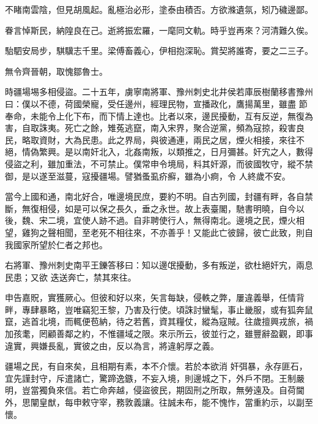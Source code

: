 \begin{pinyinscope}
 不睹南雲陰，但見胡風起。亂極治必形，塗泰由積否。方欲滌遺氛，矧乃穢邊鄙。



 眷言悼斯民，納隍良在己。逝將振宏羅，一麾同文軌。時乎豈再來？河清難久俟。



 駘駟安局步，騏驥志千里。梁傅畜義心，伊相抱深恥。賞契將誰寄，要之二三子。



 無令齊晉朝，取愧鄒魯士。



 時疆場埸多相侵盜。二十五年，虜寧南將軍、豫州刺史北井侯若庫辰樹蘭移書豫州曰：僕以不德，荷國榮寵，受任邊州，經理民物，宣播政化，鷹揚萬里，雖盡
 節奉命，未能令上化下布，而下情上達也。比者以來，邊民擾動，互有反逆，無復為害，自取誅夷。死亡之餘，雉菟逃竄，南入宋界，聚合逆黨，頻為寇掠，殺害良民，略取資財，大為民患。此之界局，與彼通連，兩民之居，煙火相接，來往不絕，情偽繁興。是以南奸北入，北姦南叛，以類推之，日月彌甚。奸宄之人，數得侵盜之利，雖加重法，不可禁止。僕常申令境局，料其奸源，而彼國牧守，縱不禁御，是以遂至滋蔓，寇擾疆場。譬猶蚤虱疥癬，雖為小痾，令
 人終歲不安。



 當今上國和通，南北好合，唯邊境民庶，要約不明。自古列國，封疆有畔，各自禁斷，無復相侵，如是可以保之長久，垂之永世。故上表臺閣，馳書明曉，自今以後，魏、宋二境，宜使人跡不過。自非聘使行人，無得南北。邊境之民，煙火相望，雞狗之聲相聞，至老死不相往來，不亦善乎！又能此亡彼歸，彼亡此致，則自我國家所望於仁者之邦也。



 右將軍、豫州刺史南平王鑠答移曰：知以邊氓擾動，多有叛逆，欲杜絕奸宄，兩息民患；又欲
 迭送奔亡，禁其來往。



 申告嘉貺，實獲厥心。但彼和好以來，矢言每缺，侵軼之弊，屢違義舉，任情背畔，專肆暴略，豈唯竊犯王黎，乃害及行使。頃誅討蠻髦，事止畿服，或有狐奔鼠竄，逃首北境，而輒便苞納，待之若舊，資其糧仗，縱為寇賊。往歲擅興戎旅，禍加孩耄，罔顧善鄰之約，不惟疆域之限。來示所云，彼並行之，雖豐辭盈觀，即事違實，興嫌長亂，實彼之由，反以為言，將違躬厚之義。



 疆場之民，有自來矣，且相期有素，本不介懷。若於本欲消
 奸弭暴，永存匪石，宜先謹封守，斥遣諸亡，驚蹄逸鏃，不妄入境，則邊城之下，外戶不閉。王制嚴明，豈當獨負來信。若亡命奔越，侵盜彼民，期固刑之所取，無勞遠及。自荷閫外，思闡皇猷，每申敕守宰，務敦義讓。往誠未布，能不愧怍，當重約示，以副至懷。




\end{pinyinscope}
